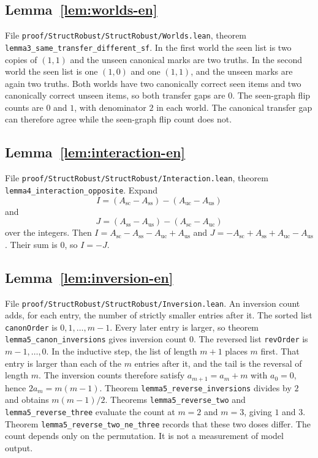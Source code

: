 \documentclass[11pt,a4paper]{article}
\theoremstyle{plain}
\begin{document}
\subsection{Lemma~\ref{lem:worlds-en}}

File \texttt{proof/StructRobust/StructRobust/Worlds.lean}, theorem
\texttt{lemma3\_same\_transfer\_different\_sf}. In the first world the seen
list is two copies of $(1,1)$ and the unseen canonical marks are two truths.
In the second world the seen list is one $(1,0)$ and one $(1,1)$, and the
unseen marks are again two truths. Both worlds have two canonically correct
seen items and two canonically correct unseen items, so both transfer gaps are
$0$. The seen-graph flip counts are $0$ and $1$, with denominator $2$ in each
world. The canonical transfer gap can therefore agree while the seen-graph
flip count does not.

\subsection{Lemma~\ref{lem:interaction-en}}

File \texttt{proof/StructRobust/StructRobust/Interaction.lean}, theorem
\texttt{lemma4\_interaction\_opposite}. Expand
\[
I=(A_{\mathrm{sc}}-A_{\mathrm{ss}})-(A_{\mathrm{uc}}-A_{\mathrm{us}})
\]
and
\[
J=(A_{\mathrm{ss}}-A_{\mathrm{us}})-(A_{\mathrm{sc}}-A_{\mathrm{uc}})
\]
over the integers. Then
$I=A_{\mathrm{sc}}-A_{\mathrm{ss}}-A_{\mathrm{uc}}+A_{\mathrm{us}}$ and
$J=-A_{\mathrm{sc}}+A_{\mathrm{ss}}+A_{\mathrm{uc}}-A_{\mathrm{us}}$. Their sum
is $0$, so $I=-J$.

\subsection{Lemma~\ref{lem:inversion-en}}

File \texttt{proof/StructRobust/StructRobust/Inversion.lean}. An inversion
count adds, for each entry, the number of strictly smaller entries after it.
The sorted list \texttt{canonOrder} is $0,1,\ldots,m-1$. Every later entry is
larger, so theorem \texttt{lemma5\_canon\_inversions} gives inversion count
$0$. The reversed list \texttt{revOrder} is $m-1,\ldots,0$. In the inductive
step, the list of length $m+1$ places $m$ first. That entry is larger than
each of the $m$ entries after it, and the tail is the reversal of length $m$.
The inversion counts therefore satisfy $a_{m+1}=a_m+m$ with $a_0=0$, hence
$2a_m=m(m-1)$. Theorem \texttt{lemma5\_reverse\_inversions} divides by $2$ and
obtains $m(m-1)/2$. Theorems \texttt{lemma5\_reverse\_two} and
\texttt{lemma5\_reverse\_three} evaluate the count at $m=2$ and $m=3$, giving
$1$ and $3$. Theorem \texttt{lemma5\_reverse\_two\_ne\_three} records that
these two doses differ. The count depends only on the permutation. It is not a
measurement of model output.
\end{document}
